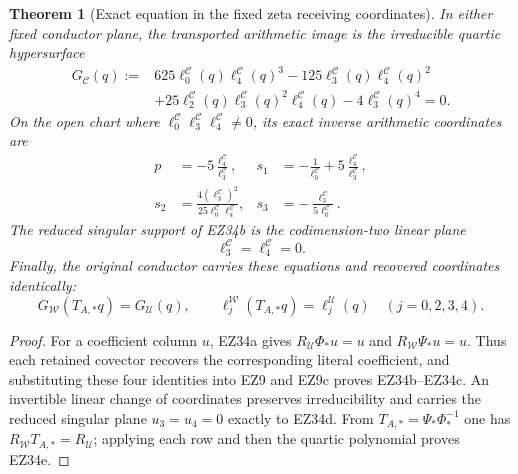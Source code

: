 \documentclass[11pt]{article}
\newtheorem{theorem}{Theorem}[section]
\theoremstyle{definition}\newtheorem{definition}[theorem]{Definition}
\theoremstyle{remark}\newtheorem{remark}[theorem]{Remark}
\begin{document}
\begin{theorem}[Exact equation in the fixed zeta receiving coordinates]
In either fixed conductor plane, the transported arithmetic image is the
irreducible quartic hypersurface
\begin{align}
 G_{\mathcal C}(q):={}&
 625\ell^{\mathcal C}_0(q)\ell^{\mathcal C}_4(q)^3
 -125\ell^{\mathcal C}_3(q)\ell^{\mathcal C}_4(q)^2\nonumber\\
 &+25\ell^{\mathcal C}_2(q)\ell^{\mathcal C}_3(q)^2
                    \ell^{\mathcal C}_4(q)
 -4\ell^{\mathcal C}_3(q)^4=0.                       \tag{EZ34b}
\end{align}
On the open chart where
\(\ell^{\mathcal C}_0\ell^{\mathcal C}_3
\ell^{\mathcal C}_4\ne0\), its exact inverse arithmetic coordinates are
\begin{align}
 p&=-5\frac{\ell^{\mathcal C}_4}{\ell^{\mathcal C}_3},&
 s_1&=-\frac1{\ell^{\mathcal C}_0}
          +5\frac{\ell^{\mathcal C}_4}{\ell^{\mathcal C}_3},\nonumber\\
 s_2&=\frac{4(\ell^{\mathcal C}_3)^2}
              {25\ell^{\mathcal C}_0\ell^{\mathcal C}_4},&
 s_3&=-\frac{\ell^{\mathcal C}_3}
             {5\ell^{\mathcal C}_0}.                 \tag{EZ34c}
\end{align}
The reduced singular support of EZ34b is the codimension-two linear plane
\begin{equation}
 \ell^{\mathcal C}_3=\ell^{\mathcal C}_4=0.           \tag{EZ34d}
\end{equation}
Finally, the original conductor carries these equations and recovered
coordinates identically:
\begin{equation}
 G_{\mathcal W}(T_{A,*}q)=G_{\mathcal U}(q),\qquad
 \ell_j^{\mathcal W}(T_{A,*}q)=\ell_j^{\mathcal U}(q)
 \quad(j=0,2,3,4).                                    \tag{EZ34e}
\end{equation}
\end{theorem}

\begin{proof}
For a coefficient column \(u\), EZ34a gives
\(R_{\mathcal U}\Phi_*u=u\) and
\(R_{\mathcal W}\Psi_*u=u\).  Thus each retained covector recovers the
corresponding literal coefficient, and substituting these four identities
into EZ9 and EZ9c proves EZ34b--EZ34c.  An invertible linear change of
coordinates preserves irreducibility and carries the reduced singular plane
\(u_3=u_4=0\) exactly to EZ34d.  From
\(T_{A,*}=\Psi_*\Phi_*^{-1}\) one has
\(R_{\mathcal W}T_{A,*}=R_{\mathcal U}\); applying each row and then the
quartic polynomial proves EZ34e.
\end{proof}
\end{document}

